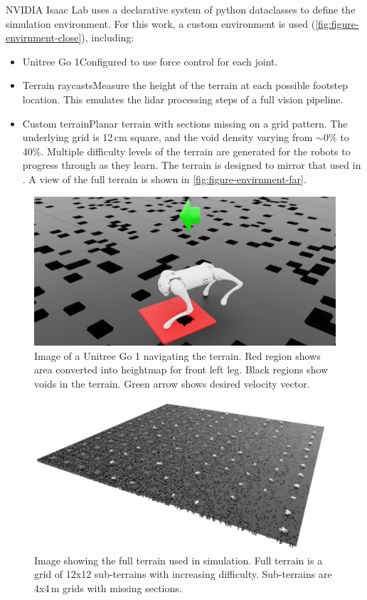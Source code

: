 NVIDIA Isaac Lab uses a declarative system of python dataclasses to
define the simulation environment. For this work, a custom
environment is used (\autoref{fig:figure-envirnment-close}), including:

\begin{itemize}
  \item Unitree Go 1\textemdash Configured to use force control for each joint.
  \item Terrain raycasts\textemdash Measure the height of the terrain
    at each possible footstep location. This emulates the lidar
    processing steps of a full vision pipeline.
  \item Custom terrain\textemdash Planar terrain with sections
    missing on a grid pattern. The underlying grid is 12\,cm square,
    and the void density varying from $\sim$0\% to 40\%. Multiple
    difficulty levels of the     terrain are generated for the robots
    to progress through as     they learn. The terrain is designed to
    mirror that used in
    \cite{bratta_contactnet_2024}. A view of the full terrain is shown
    in \autoref{fig:figure-envirnment-far}.
\end{itemize}

\begin{figure}[H]
  \centering
  \includegraphics[width=0.75\linewidth]{images/figures/environment-close.png}
  \caption{Image of a Unitree Go 1 navigating the terrain. Red
    region shows area converted into heightmap for front left leg.
    Black regions show voids   in the terrain. Green arrow shows
  desired velocity vector.}
  \label{fig:figure-envirnment-close}
\end{figure}

\begin{figure}[H]
  \centering
  \includegraphics[width=0.75\linewidth]{images/figures/environment-far.png}
  \caption{Image showing the full terrain used in simulation.
    Full terrain is a grid of 12x12 sub-terrains with increasing
  difficulty.     Sub-terrains are 4x4\,m grids with missing sections.}
  \label{fig:figure-envirnment-far}
\end{figure}
